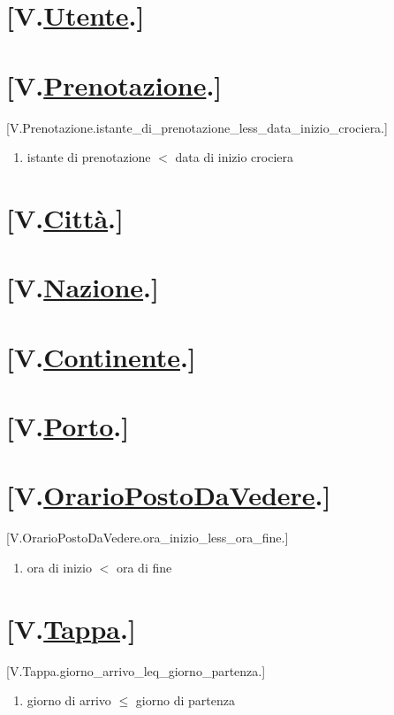 \documentclass{article}
\begin{document}
\section*{[V.\hyperref[sec:Utente]{Utente}.]}\label{sec:VincoliUtente}
\section*{[V.\hyperref[sec:Prenotazione]{Prenotazione}.]}\label{sec:VincoliPrenotazione}
    [V.Prenotazione.istante\_di\_prenotazione\_less\_data\_inizio\_crociera.]
    \begin{enumerate}
        \item istante di prenotazione $<$ data di inizio crociera
    \end{enumerate}
\section*{[V.\hyperref[sec:Città]{Città}.]}\label{sec:VincoliCittà}
\section*{[V.\hyperref[sec:Nazione]{Nazione}.]}\label{sec:VincoliNazione}
\section*{[V.\hyperref[sec:Continente]{Continente}.]}\label{sec:VincoliContinente}
\section*{[V.\hyperref[sec:Porto]{Porto}.]}\label{sec:VincoliPorto}
\section*{[V.\hyperref[sec:OrarioPostoDaVedere]{OrarioPostoDaVedere}.]}\label{sec:VincoliOrarioPostoDaVedere}
    [V.OrarioPostoDaVedere.ora\_inizio\_less\_ora\_fine.]
    \begin{enumerate}
        \item ora di inizio $<$ ora di fine
    \end{enumerate}
\section*{[V.\hyperref[sec:Tappa]{Tappa}.]}\label{sec:VincoliTappa}
    [V.Tappa.giorno\_arrivo\_leq\_giorno\_partenza.]
    \begin{enumerate}
        \item giorno di arrivo $\leq$ giorno di partenza
    \end{enumerate}
\end{document}
